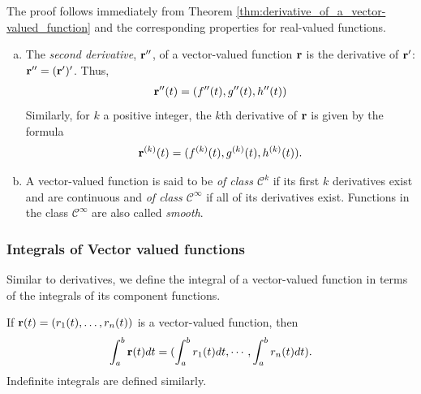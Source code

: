 \documentclass[12pt,letterpaper,reqno]{article}
\numberwithin{equation}{section}
\newcommand{\bbr}{{\bf r}}
\begin{document}
{\begin{pf}
The proof follows immediately from Theorem \ref{thm:derivative_of_a_vector-valued_function} and the corresponding properties for real-valued functions.
\end{pf}


\begin{defn}
	\begin{enumerate}[(a)]
		\item The \emph{second derivative}, $\bbr''$, of a vector-valued function $\bbr$ is the derivative of $\bbr'$: $\bbr''=(\bbr')'$. Thus,
\begin{align*}
	\bbr''(t)=(f''(t), g''(t), h''(t))
\end{align*}
Similarly, for $k$ a positive integer, the $k$th derivative of $\bbr$ is given by the formula
\begin{align*}
	\bbr^{(k)}(t)=(f^{(k)}(t), g^{(k)}(t), h^{(k)}(t)).
\end{align*}
\item A vector-valued function is said to be \emph{of class $\mathscr{C}^k$} if its first $k$ derivatives exist and are continuous and \emph{of class $\mathscr{C}^\infty$} if all of its derivatives exist. Functions in the class $\mathscr{C}^\infty$ are also called \emph{smooth}.
	\end{enumerate}
\end{defn}

\subsubsection{Integrals of Vector valued functions}
Similar to derivatives, we define the integral of a vector-valued function in terms of the integrals of its component functions.

\begin{defn}
	If $\bbr(t)=(r_1(t),\dots,r_n(t))$ is a vector-valued function, then
	\begin{align*}
		\int_a^b \bbr(t)dt=(\int_a^b r_1(t)dt,\cdots,\int_a^b r_n(t)dt).
	\end{align*}
	Indefinite integrals are defined similarly.
\end{defn}

}
\end{document}
